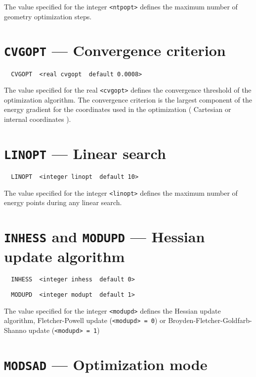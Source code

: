 The value specified for the integer \verb+<ntpopt>+ defines the maximum 
number of geometry optimization steps.  

\section{{\tt CVGOPT} --- Convergence criterion}

\begin{verbatim}
  CVGOPT  <real cvgopt  default 0.0008>
\end{verbatim}
 
The value specified for the real \verb+<cvgopt>+ defines the convergence
threshold of the optimization algorithm. The convergence criterion is
the largest component of the energy gradient for the coordinates used
in the optimization ( Cartesian or internal coordinates ).

\section{{\tt LINOPT} --- Linear search}

\begin{verbatim}
  LINOPT  <integer linopt  default 10>
\end{verbatim}

The value specified for the integer \verb+<linopt>+ defines the maximum 
number of energy points during any linear search. 

\section{{\tt INHESS} and {\tt MODUPD} --- Hessian update algorithm}

\begin{verbatim}
  INHESS  <integer inhess  default 0>
\end{verbatim}

\begin{verbatim}
  MODUPD  <integer modupt  default 1>
\end{verbatim}

\sloppy

The value specified for the integer \verb+<modupd>+ defines the
Hessian update algorithm, Fle\-tcher-Powell update (\verb+<modupd> = 0+)
or Broy\-den-Fle\-tcher-Gold\-farb-Shanno update (\verb+<modupd> = 1+)

\section{{\tt MODSAD} --- Optimization mode}

